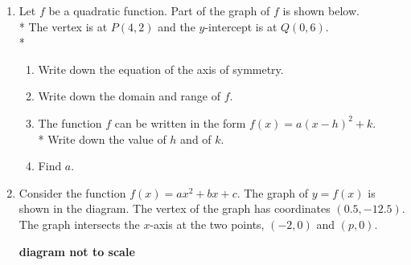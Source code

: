 \documentclass[12pt, twoside]{article}
\begin{document}
\begin{enumerate}
\newpage
\item Let $f$ be a quadratic function. Part of the graph of $f$ is shown below.\\*
The vertex is at $P(4,2)$ and the $y$-intercept is at $Q(0, 6)$.\\*
    \begin{center}
    \end{center}
    \begin{enumerate}[itemsep=1.5cm]
        \item Write down the equation of the axis of symmetry.
        \item Write down the domain and range of $f$.
        \item The function $f$ can be written in the form $f(x)=a(x-h)^2 +k$. \\*
        Write down the value of $h$ and of $k$.
        \item Find $a$.
    \end{enumerate}

\newpage
\item Consider the function $f(x)=ax^2 + bx+c$. The graph of $y=f(x)$ is shown in the diagram. The vertex of the graph has coordinates $(0.5, -12.5)$. The graph intersects the $x$-axis at the two points, $(-2,0)$ and $(p,0)$.
    \begin{flushright}
        \bf{diagram not to scale}
    \end{flushright}
        \begin{center}
\end{center}
\end{enumerate}
\end{document}
